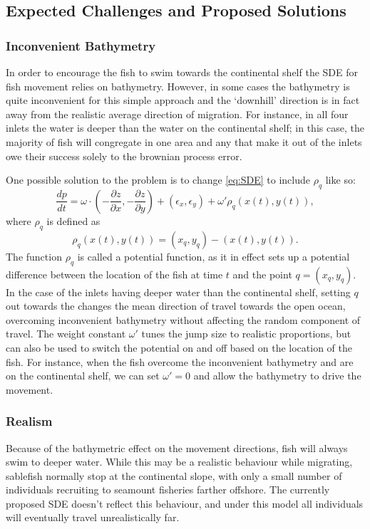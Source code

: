 \documentclass{article}
\begin{document}
\subsection{Expected Challenges and Proposed Solutions}

\subsubsection*{Inconvenient Bathymetry}

In order to encourage the fish to swim towards the continental shelf the SDE for fish movement relies on bathymetry. However, in some cases the bathymetry is quite inconvenient for this simple approach and the `downhill' direction is in fact away from the realistic average direction of migration. For instance, in all four inlets the water is deeper than the water on the continental shelf; in this case, the majority of fish will congregate in one area and any that make it out of the inlets owe their success solely to the brownian process error.

One possible solution to the problem is to change \eqref{eq:SDE} to include $\rho_q$ like so:
\[
\frac{dp}{dt} = \omega \cdot \left( - \frac{\partial z}{\partial x}, - \frac{\partial z}{\partial y} \right) + (\epsilon_x, \epsilon_y) + \omega' \rho_{q} ( x(t), y(t) ),
\]
where $\rho_q$ is defined as
\[
  \rho_q ( x(t), y(t) ) = (x_q, y_q) - (x(t), y(t) ).
\]
The function $\rho_q$ is called a potential function, as it in effect sets up a potential difference between the location of the fish at time $t$ and the point $q = (x_q, y_q)$. In the case of the inlets having deeper water than the continental shelf, setting $q$ out towards the changes the mean direction of travel towards the open ocean, overcoming inconvenient bathymetry without affecting the random component of travel. The weight constant $\omega'$ tunes the jump size to realistic proportions, but can also be used to switch the potential on and off based on the location of the fish. For instance, when the fish overcome the inconvenient bathymetry and are on the continental shelf, we can set $\omega' = 0$ and allow the bathymetry to drive the movement.

\subsubsection*{Realism}

Because of the bathymetric effect on the movement directions, fish will always swim to deeper water. While this may be a realistic behaviour while migrating, sablefish normally stop at the continental slope, with only a small number of individuals recruiting to seamount fisheries farther offshore. The currently proposed SDE doesn't reflect this behaviour, and under this model all individuals will eventually travel unrealistically far. 
\end{document}
